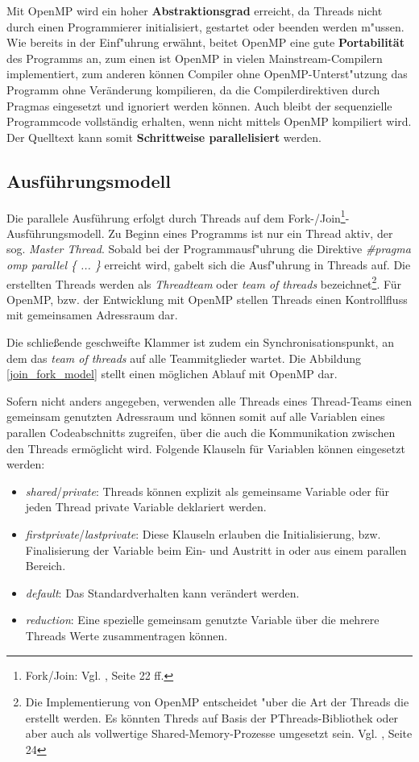 \documentclass[11pt]{scrartcl}
\begin{document}
Mit OpenMP wird ein hoher \textbf{Abstraktionsgrad} erreicht, da Threads nicht durch einen Programmierer initialisiert, gestartet oder beenden werden m"ussen. Wie bereits in der Einf"uhrung erwähnt, beitet OpenMP eine gute \textbf{Portabilität} des Programms an, zum einen ist OpenMP in vielen Mainstream-Compilern implementiert, zum anderen können Compiler ohne OpenMP-Unterst"utzung das Programm ohne Veränderung kompilieren, da die Compilerdirektiven durch Pragmas eingesetzt und ignoriert werden können. Auch bleibt der sequenzielle Programmcode vollständig erhalten, wenn nicht mittels OpenMP kompiliert wird. Der Quelltext kann somit \textbf{Schrittweise parallelisiert} werden. 

\subsection{Ausführungsmodell}

Die parallele Ausführung erfolgt durch Threads auf dem Fork-/Join\footnote{Fork/Join: Vgl. \cite{openmp08}, Seite 22 ff.}-Ausführungsmodell. Zu Beginn eines Programms ist nur ein Thread aktiv, der sog. \textit{Master Thread}. Sobald bei der Programmausf"uhrung die Direktive \textit{\#pragma omp parallel \{ ... \} } erreicht wird, gabelt sich die Ausf"uhrung in Threads auf. Die erstellten Threads werden als \textit{Threadteam} oder \textit{team of threads} bezeichnet\footnote{Die Implementierung von OpenMP entscheidet "uber die Art der Threads die erstellt werden. Es könnten Threds auf Basis der PThreads-Bibliothek oder aber auch als vollwertige Shared-Memory-Prozesse umgesetzt sein. Vgl. \cite{openmp08}, Seite 24}. Für OpenMP, bzw. der Entwicklung mit OpenMP stellen Threads einen Kontrollfluss mit gemeinsamen Adressraum dar. 

Die schließende geschweifte Klammer ist zudem ein Synchronisationspunkt, an dem das \emph{team of threads} auf alle Teammitglieder wartet. Die Abbildung \ref{join_fork_model} stellt einen möglichen Ablauf mit OpenMP dar.

Sofern nicht anders angegeben, verwenden alle Threads eines Thread-Teams einen gemeinsam genutzten Adressraum und können somit auf alle Variablen eines parallen Codeabschnitts zugreifen, über die auch die Kommunikation zwischen den Threads ermöglicht wird. Folgende Klauseln für Variablen können eingesetzt werden:

\begin{itemize}
\item \textit{shared}/\textit{private}: Threads können explizit als gemeinsame Variable oder für jeden Thread private Variable deklariert werden.
\item \textit{firstprivate}/\textit{lastprivate}: Diese Klauseln erlauben die Initialisierung, bzw. Finalisierung der Variable beim Ein- und Austritt in oder aus einem parallen Bereich.
\item \textit{default}: Das Standardverhalten kann verändert werden. %
\item \textit{reduction}: Eine spezielle gemeinsam genutzte Variable über die mehrere Threads Werte zusammentragen können.
\end{itemize}
\end{document}
